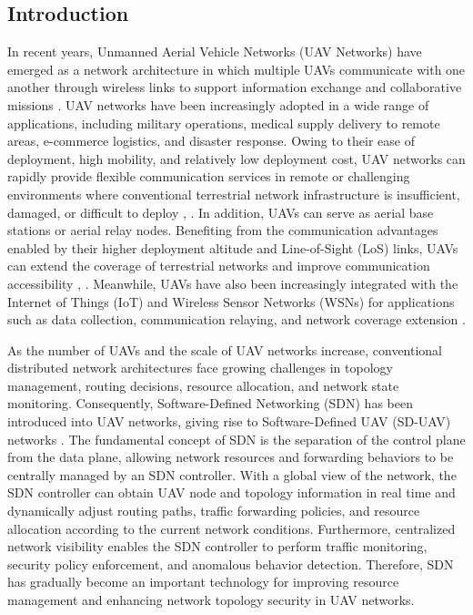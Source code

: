 \begin{ZhChapter}

\chapter{Introduction}

\text 
In recent years, Unmanned Aerial Vehicle Networks (UAV Networks) have emerged as a network architecture in which multiple UAVs communicate with one another through wireless links to support information exchange and collaborative missions \cite{hayat:2016}. UAV networks have been increasingly adopted in a wide range of applications, including military operations, medical supply delivery to remote areas, e-commerce logistics, and disaster response. Owing to their ease of deployment, high mobility, and relatively low deployment cost, UAV networks can rapidly provide flexible communication services in remote or challenging environments where conventional terrestrial network infrastructure is insufficient, damaged, or difficult to deploy \cite{gu:2023}, \cite{zeng:2016}. In addition, UAVs can serve as aerial base stations or aerial relay nodes. Benefiting from the communication advantages enabled by their higher deployment altitude and Line-of-Sight (LoS) links, UAVs can extend the coverage of terrestrial networks and improve communication accessibility \cite{zeng:2016}, \cite{mozaffari:2019}. Meanwhile, UAVs have also been increasingly integrated with the Internet of Things (IoT) and Wireless Sensor Networks (WSNs) for applications such as data collection, communication relaying, and network coverage extension \cite{gu:2023}.

As the number of UAVs and the scale of UAV networks increase, conventional distributed network architectures face growing challenges in topology management, routing decisions, resource allocation, and network state monitoring. Consequently, Software-Defined Networking (SDN) has been introduced into UAV networks, giving rise to Software-Defined UAV (SD-UAV) networks \cite{abir:2023}. The fundamental concept of SDN is the separation of the control plane from the data plane, allowing network resources and forwarding behaviors to be centrally managed by an SDN controller. With a global view of the network, the SDN controller can obtain UAV node and topology information in real time and dynamically adjust routing paths, traffic forwarding policies, and resource allocation according to the current network conditions. Furthermore, centralized network visibility enables the SDN controller to perform traffic monitoring, security policy enforcement, and anomalous behavior detection. Therefore, SDN has gradually become an important technology for improving resource management and enhancing network topology security in UAV networks.


\end{ZhChapter}
